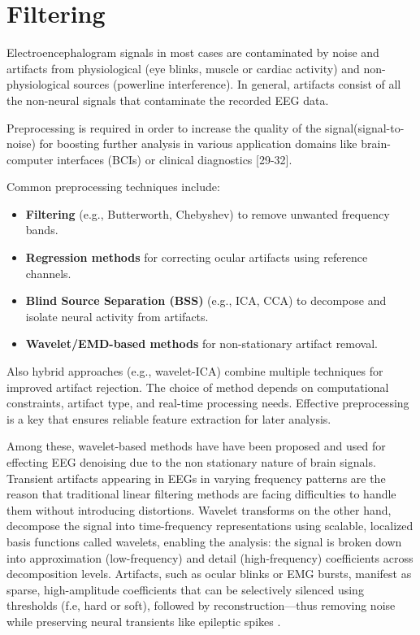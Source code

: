\documentclass{article}
\begin{document}
		\newpage
		\section{Filtering}

			Electroencephalogram signals in most cases are contaminated by noise 
			and artifacts from physiological (eye blinks, muscle or cardiac activity) 
			and non-physiological sources (powerline interference). 
			In general, artifacts consist of all the non-neural signals 
			that contaminate the recorded EEG data. 
			
			Preprocessing is required in order to increase 
			the quality of the signal(signal-to-noise)
			for boosting further analysis in various application 
			domains like brain-computer interfaces (BCIs) 
			or clinical diagnostics [29-32].
			
			Common preprocessing techniques include:  
			\begin{itemize}  
			    \item \textbf{Filtering} (e.g., Butterworth, Chebyshev) to remove unwanted frequency bands.  
			    \item \textbf{Regression methods} for correcting ocular artifacts using reference channels.  
			    \item \textbf{Blind Source Separation (BSS)} (e.g., ICA, CCA) to decompose and isolate neural activity from artifacts.  
			    \item \textbf{Wavelet/EMD-based methods} for non-stationary artifact removal.  
			\end{itemize}  
			
			Also hybrid approaches (e.g., wavelet-ICA) combine multiple techniques for improved artifact rejection. 
			The choice of method depends on computational constraints, artifact type, 
			and real-time processing needs. 
			Effective preprocessing is a key that ensures reliable feature extraction for later analysis.  

			Among these, wavelet-based methods have have been proposed and used 
			for effecting EEG denoising due to the non stationary nature of brain signals.
			Transient artifacts appearing in EEGs in varying frequency patterns are the reason that 
			traditional linear filtering methods are facing difficulties to handle them 
			without introducing distortions.
			Wavelet transforms on the other hand, decompose the signal 
			into time-frequency representations using scalable, 
			localized basis functions called wavelets, 
			enabling the analysis: the signal is broken down into approximation (low-frequency) 
			and detail (high-frequency) coefficients across decomposition levels. 
			Artifacts, such as ocular blinks or EMG bursts, 
			manifest as sparse, high-amplitude coefficients that can be selectively 
			silenced using thresholds (f.e, hard or soft), 
			followed by reconstruction---thus removing noise while preserving neural transients like epileptic 
			spikes \cite{grobbelaar2022survey}. 
\end{document}
